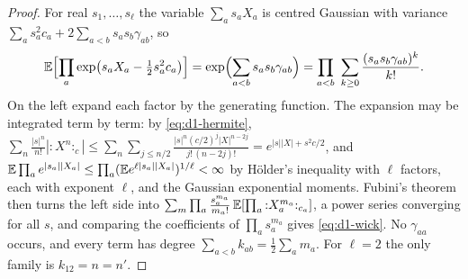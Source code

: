 \begin{proof}
For real $s_1,\dots,s_\ell$ the variable $\sum_as_aX_a$ is centred Gaussian with variance
$\sum_as_a^2c_a+2\sum_{a<b}s_as_b\gamma_{ab}$, so
\[
 \mathbb{E}\Bigl[\prod_a\exp\bigl(s_aX_a-\tfrac12s_a^2c_a\bigr)\Bigr]
 =\exp\Bigl(\sum_{a<b}s_as_b\gamma_{ab}\Bigr)
 =\prod_{a<b}\ \sum_{k\ge0}\frac{(s_as_b\gamma_{ab})^k}{k!} .
\]
On the left expand each factor by the generating function. The expansion may be integrated
term by term: by \eqref{eq:d1-hermite},
$\sum_n\frac{|s|^n}{n!}|{:}X^n{:}_c|
\le\sum_n\sum_{j\le n/2}\frac{|s|^n(c/2)^j|X|^{n-2j}}{j!\,(n-2j)!}=e^{|s||X|+s^2c/2}$, and
$\mathbb{E}\prod_ae^{|s_a||X_a|}\le\prod_a(\mathbb{E} e^{\ell|s_a||X_a|})^{1/\ell}<\infty$ by H\"older's
inequality with $\ell$ factors, each with exponent $\ell$, and the Gaussian exponential
moments. Fubini's theorem then turns the left side into
$\sum_m\prod_a\frac{s_a^{m_a}}{m_a!}\,\mathbb{E}[\prod_a{:}X_a^{m_a}{:}_{c_a}]$, a power series
converging for all $s$, and comparing the coefficients of $\prod_as_a^{m_a}$ gives
\eqref{eq:d1-wick}. No $\gamma_{aa}$ occurs, and every term has degree
$\sum_{a<b}k_{ab}=\frac12\sum_am_a$. For $\ell=2$ the only family is $k_{12}=n=n'$.
\end{proof}

